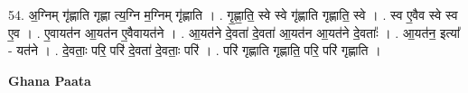 \documentclass[17pt]{extarticle}
\begin{document}
54. अ॒ग्निम् गृ॑ह्णाति गृह्णा त्य॒ग्नि म॒ग्निम् गृ॑ह्णाति । . गृ॒ह्णा॒ति॒ स्वे स्वे गृ॑ह्णाति गृह्णाति॒ स्वे । . स्व ए॒वैव स्वे स्व ए॒व । . ए॒वायत॑न आ॒यत॑न ए॒वैवायत॑ने । . आ॒यत॑ने दे॒वता॑ दे॒वता॑ आ॒यत॑न आ॒यत॑ने दे॒वताः᳚ । . आ॒यत॑न॒ इत्या᳚ - यत॑ने । . दे॒वताः॒ परि॒ परि॑ दे॒वता॑ दे॒वताः॒ परि॑ । . परि॑ गृह्णाति गृह्णाति॒ परि॒ परि॑ गृह्णाति । \newline

\textbf{Ghana Paata } \newline
\end{document}
